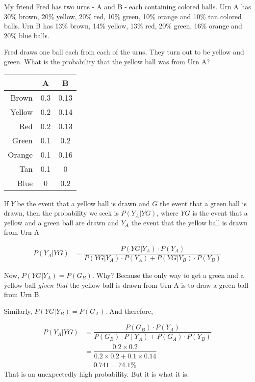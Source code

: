 

\question[5]
  My friend Fred has two urns - A and B - each containing colored balls. Urn A
  has 30\% brown, 20\% yellow, 20\% red, 10\% green, 10\% orange and 10\% tan 
  colored balls. Urn B has 13\% brown, 14\% yellow, 13\% red, 20\% green,
  16\% orange and 20\% blue balls. 
  
  Fred draws one ball each from each of the urns. They turn out to be yellow and
  green. What is the probability that the yellow ball was from Urn A?


\ifprintanswers
    \begin{tabular}[t]{rcc}
       \toprule
       & A & B \\
       \midrule
       Brown & 0.3 & 0.13 \\
       Yellow & 0.2 & 0.14 \\
       Red & 0.2 & 0.13 \\
       Green & 0.1 & 0.2 \\
       Orange & 0.1 & 0.16 \\
       Tan & 0.1 & 0 \\
       Blue & 0 & 0.2 \\
       \bottomrule
    \end{tabular}
\fi 

\begin{solution}[\fullpage]
   If $Y$ be the event that a yellow ball is drawn and $G$ the event that a green ball is 
   drawn, then the probability we seek is $P(Y_A \vert YG)$, where $YG$ is the event
   that a yellow and a green ball are drawn and $Y_A$ the event that the yellow ball is 
   drawn from Urn A
   
   \begin{align}
      P(Y_A \vert YG) &= \dfrac{P(YG \vert Y_A)\cdot P(Y_A)}{P(YG \vert Y_A)\cdot P(Y_A) + P(YG \vert Y_B)\cdot P(Y_B)}
   \end{align}
   
   Now, $P(YG \vert Y_A) = P(G_B)$. Why? Because the only way to get a green and a yellow ball 
   \textit{given that} the yellow ball is drawn from Urn A is to draw a green ball from Urn B.
   
   Similarly, $P(YG \vert Y_B) = P(G_A)$. And therefore, 
   
   \begin{align}
       P(Y_A \vert YG) &= \dfrac{P(G_B)\cdot P(Y_A)}{P(G_B)\cdot P(Y_A) + P(G_A)\cdot P(Y_B)} \\
                       &= \dfrac{0.2 \times 0.2}{0.2\times 0.2 + 0.1\times 0.14} \\
                       &= 0.741 = 74.1\%
   \end{align}
   That is an unexpectedly high probability. But it is what it is.
\end{solution}

